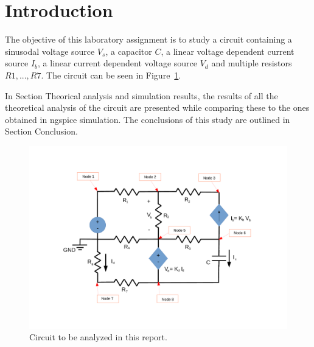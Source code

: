 \section{Introduction}
\label{sec:introduction}

The objective of this laboratory assignment is to study a circuit containing a sinusodal voltage source $V_s$, a capacitor $C$,
a linear voltage dependent current source $I_b$, a linear current dependent voltage source $V_d$ and multiple resistors $R1,...,R7$.
The circuit can be seen in Figure~\ref{fig:lab2}.


In Section Theorical analysis and simulation results, the results of all the theoretical analysis of the circuit are
presented while comparing these to the ones obtained in ngspice simulation.
The conclusions of this study are outlined in Section Conclusion.

\begin{figure}[h] \centering
\includegraphics[width=1\linewidth]{../figlib/lab2.pdf}
\caption{Circuit to be analyzed in this report.}
\label{fig:lab2}
\end{figure}



